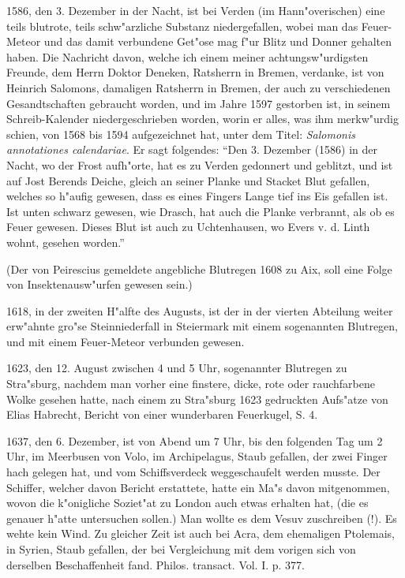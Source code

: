 \documentclass[a4paper, 11pt, oneside, polutonikogreek, german]{article}
\begin{document}
1586, den 3. Dezember in der Nacht, ist bei Verden (im Hann"overischen) eine teils blutrote, teils schw"arzliche Substanz niedergefallen, wobei man das Feuer-Meteor und das damit verbundene Get"ose mag f"ur Blitz und Donner gehalten haben. Die Nachricht davon, welche ich einem meiner achtungsw"urdigsten Freunde, dem Herrn Doktor Deneken, Ratsherrn in Bremen, verdanke, ist von Heinrich Salomons, damaligen Ratsherrn in Bremen, der auch zu verschiedenen Gesandtschaften gebraucht worden, und im Jahre 1597 gestorben ist, in seinem Schreib-Kalender niedergeschrieben worden, worin er alles, was ihm merkw"urdig schien, von 1568 bis 1594 aufgezeichnet hat, unter dem Titel: \emph{Salomonis annotationes calendariae}. Er sagt folgendes: "`Den 3. Dezember (1586) in der Nacht, wo der Frost aufh"orte, hat es zu Verden gedonnert und geblitzt, und ist auf Jost Berends Deiche, gleich an seiner Planke und Stacket Blut gefallen, welches so h"aufig gewesen, dass es eines Fingers Lange tief ins Eis gefallen ist. Ist unten schwarz gewesen, wie Drasch, hat auch die Planke verbrannt, als ob es Feuer gewesen. Dieses Blut ist auch zu Uchtenhausen, wo Evers v. d. Linth wohnt, gesehen worden."'

(Der von Peirescius gemeldete angebliche Blutregen 1608 zu Aix, soll eine Folge von Insektenausw"urfen gewesen sein.)

1618, in der zweiten H"alfte des Augusts, ist der in der vierten Abteilung weiter erw"ahnte gro"se Steinniederfall in Steiermark mit einem sogenannten Blutregen, und mit einem Feuer-Meteor verbunden gewesen.

1623, den 12. August zwischen 4 und 5 Uhr, sogenannter Blutregen zu Stra"sburg, nachdem man vorher eine finstere, dicke, rote oder rauchfarbene Wolke gesehen hatte, nach einem zu Stra"sburg 1623 gedruckten Aufs"atze von Elias Habrecht, Bericht von einer wunderbaren Feuerkugel, S. 4.

1637, den 6. Dezember, ist von Abend um 7 Uhr, bis den folgenden Tag um 2 Uhr, im Meerbusen von Volo, im Archipelagus, Staub gefallen, der zwei Finger hach gelegen hat, und vom Schiffsverdeck weggeschaufelt werden musste. Der Schiffer, welcher davon Bericht erstattete, hatte ein Ma"s davon mitgenommen, wovon die k"onigliche Soziet"at zu London auch etwas erhalten hat, (die es genauer h"atte untersuchen sollen.) Man wollte es dem Vesuv zuschreiben (!). Es wehte kein Wind. Zu gleicher Zeit ist auch bei Acra, dem ehemaligen Ptolemais, in Syrien, Staub gefallen, der bei Vergleichung mit dem vorigen sich von derselben Beschaffenheit fand. Philos. transact. Vol. I. p. 377.
\end{document}
